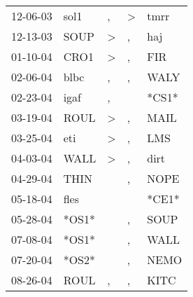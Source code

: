 \begin{supertabular}{p{0.07\textwidth}p{0.06\textwidth}p{0.02\textwidth}p{0.02\textwidth}p{0.06\textwidth}}
          12-06-03\textsuperscript{} &           sol1\textsuperscript{} &                , &     \textgreater &           tmrr\textsuperscript{} \\
          12-13-03\textsuperscript{} &           SOUP\textsuperscript{} &     \textgreater &                , &            haj\textsuperscript{} \\
          01-10-04\textsuperscript{} &           CRO1\textsuperscript{} &     \textgreater &                , &            FIR\textsuperscript{} \\
          02-06-04\textsuperscript{} &           blbc\textsuperscript{} &                , &                , &           WALY\textsuperscript{} \\
          02-23-04\textsuperscript{} &           igaf\textsuperscript{} &                , &                  &                            *CS1* \\
          03-19-04\textsuperscript{} &           ROUL\textsuperscript{} &     \textgreater &                , &           MAIL\textsuperscript{} \\
          03-25-04\textsuperscript{} &            eti\textsuperscript{} &     \textgreater &                , &            LMS\textsuperscript{} \\
          04-03-04\textsuperscript{} &           WALL\textsuperscript{} &     \textgreater &                , &           dirt\textsuperscript{} \\
          04-29-04\textsuperscript{} &           THIN\textsuperscript{} &                  &                , &           NOPE\textsuperscript{} \\
          05-18-04\textsuperscript{} &           fles\textsuperscript{} &                  &                  &                            *CE1* \\
          05-28-04\textsuperscript{} &                            *OS1* &                  &                , &           SOUP\textsuperscript{} \\
          07-08-04\textsuperscript{} &                            *OS1* &                  &                , &           WALL\textsuperscript{} \\
          07-20-04\textsuperscript{} &                            *OS2* &                  &                , &           NEMO\textsuperscript{} \\
          08-26-04\textsuperscript{} &           ROUL\textsuperscript{} &                , &                , &           KITC\textsuperscript{} \\

\end{supertabular}
